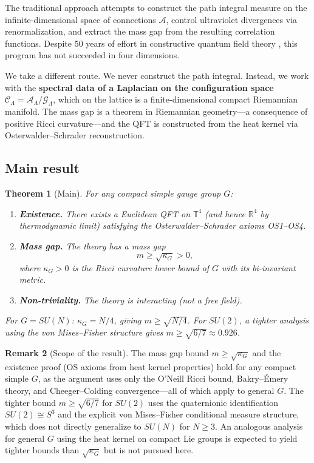 \documentclass[11pt]{article}
\newtheorem{theorem}{Theorem}[section]
\theoremstyle{definition}
\newtheorem{remark}[theorem]{Remark}
\newcommand{\calA}{\mathcal{A}}
\newcommand{\calG}{\mathcal{G}}
\newcommand{\calC}{\mathcal{C}}
\newcommand{\R}{\mathbb{R}}
\newcommand{\T}{\mathbb{T}}
\begin{document}
The traditional approach attempts to construct the path integral measure on the infinite-dimensional space of connections $\calA$, control ultraviolet divergences via renormalization, and extract the mass gap from the resulting correlation functions. Despite 50 years of effort in constructive quantum field theory \cite{GlimmJaffe}, this program has not succeeded in four dimensions.

We take a different route. We never construct the path integral. Instead, we work with the \textbf{spectral data of a Laplacian on the configuration space} $\calC_\Lambda = \calA_\Lambda/\calG_\Lambda$, which on the lattice is a finite-dimensional compact Riemannian manifold. The mass gap is a theorem in Riemannian geometry---a consequence of positive Ricci curvature---and the QFT is constructed from the heat kernel via Osterwalder--Schrader reconstruction.

\subsection{Main result}

\begin{theorem}[Main]
\label{thm:main-intro}
For any compact simple gauge group $G$:
\begin{enumerate}[label=(\alph*)]
    \item \textbf{Existence.} There exists a Euclidean QFT on $\T^4$ (and hence $\R^4$ by thermodynamic limit) satisfying the Osterwalder--Schrader axioms OS1--OS4.

    \item \textbf{Mass gap.} The theory has a mass gap
    \begin{equation}\label{eq:main-gap}
        m \geq \sqrt{\kappa_G} > 0,
    \end{equation}
    where $\kappa_G > 0$ is the Ricci curvature lower bound of $G$ with its bi-invariant metric.

    \item \textbf{Non-triviality.} The theory is interacting (not a free field).
\end{enumerate}
For $G = SU(N)$: $\kappa_G = N/4$, giving $m \geq \sqrt{N/4}$. For $SU(2)$, a tighter analysis using the von Mises--Fisher structure gives $m \geq \sqrt{6/7} \approx 0.926$.
\end{theorem}

\begin{remark}[Scope of the result]
\label{rem:scope}
The mass gap bound $m \geq \sqrt{\kappa_G}$ and the existence proof (OS axioms from heat kernel properties) hold for any compact simple $G$, as the argument uses only the O'Neill Ricci bound, Bakry--\'Emery theory, and Cheeger--Colding convergence---all of which apply to general $G$. The tighter bound $m \geq \sqrt{6/7}$ for $SU(2)$ uses the quaternionic identification $SU(2) \cong S^3$ and the explicit von Mises--Fisher conditional measure structure, which does not directly generalize to $SU(N)$ for $N \geq 3$. An analogous analysis for general $G$ using the heat kernel on compact Lie groups is expected to yield tighter bounds than $\sqrt{\kappa_G}$ but is not pursued here.
\end{remark}
\end{document}
